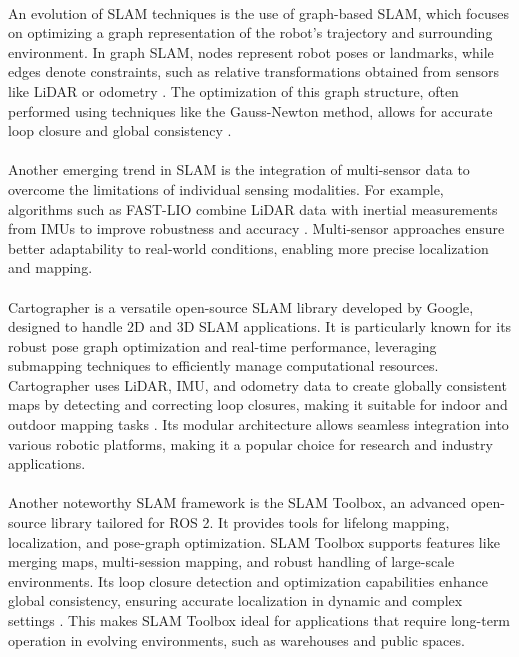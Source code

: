 \paragraph*{} 
An evolution of SLAM techniques is the use of graph-based SLAM, which focuses on optimizing a graph representation of the robot's trajectory and surrounding environment. In graph SLAM, nodes represent robot poses or landmarks, while edges denote constraints, such as relative transformations obtained from sensors like LiDAR or odometry \cite{grisetti2010tutorial}. The optimization of this graph structure, often performed using techniques like the Gauss-Newton method, allows for accurate loop closure and global consistency \cite{kummerle2011g2o}.

\paragraph*{} 
Another emerging trend in SLAM is the integration of multi-sensor data to overcome the limitations of individual sensing modalities. For example, algorithms such as FAST-LIO combine LiDAR data with inertial measurements from IMUs to improve robustness and accuracy \cite{xu2021fast}. Multi-sensor approaches ensure better adaptability to real-world conditions, enabling more precise localization and mapping.

\paragraph*{} 
Cartographer is a versatile open-source SLAM library developed by Google, designed to handle 2D and 3D SLAM applications. It is particularly known for its robust pose graph optimization and real-time performance, leveraging submapping techniques to efficiently manage computational resources. Cartographer uses LiDAR, IMU, and odometry data to create globally consistent maps by detecting and correcting loop closures, making it suitable for indoor and outdoor mapping tasks \cite{hess2016real}. Its modular architecture allows seamless integration into various robotic platforms, making it a popular choice for research and industry applications.

\paragraph*{} 
Another noteworthy SLAM framework is the SLAM Toolbox, an advanced open-source library tailored for ROS 2. It provides tools for lifelong mapping, localization, and pose-graph optimization. SLAM Toolbox supports features like merging maps, multi-session mapping, and robust handling of large-scale environments. Its loop closure detection and optimization capabilities enhance global consistency, ensuring accurate localization in dynamic and complex settings \cite{macenski2021slamtoolbox}. This makes SLAM Toolbox ideal for applications that require long-term operation in evolving environments, such as warehouses and public spaces.

